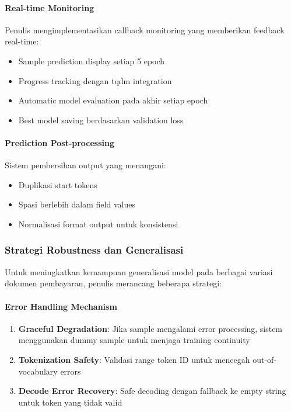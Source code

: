 \paragraph{Real-time Monitoring}
Penulis mengimplementasikan callback monitoring yang memberikan feedback real-time:
\begin{itemize}
    \item Sample prediction display setiap 5 epoch
    \item Progress tracking dengan tqdm integration
    \item Automatic model evaluation pada akhir setiap epoch
    \item Best model saving berdasarkan validation loss
\end{itemize}

\paragraph{Prediction Post-processing}
Sistem pembersihan output yang menangani:
\begin{itemize}
    \item Duplikasi start tokens
    \item Spasi berlebih dalam field values
    \item Normalisasi format output untuk konsistensi
\end{itemize}

\subsubsection{Strategi Robustness dan Generalisasi}
\label{subsubsec:strategi-robustness}

Untuk meningkatkan kemampuan generalisasi model pada berbagai variasi dokumen pembayaran, penulis merancang beberapa strategi:

\paragraph{Error Handling Mechanism}
\begin{enumerate}
    \item \textbf{Graceful Degradation}: Jika sample mengalami error processing, sistem menggunakan dummy sample untuk menjaga training continuity
    \item \textbf{Tokenization Safety}: Validasi range token ID untuk mencegah out-of-vocabulary errors
    \item \textbf{Decode Error Recovery}: Safe decoding dengan fallback ke empty string untuk token yang tidak valid
\end{enumerate}

